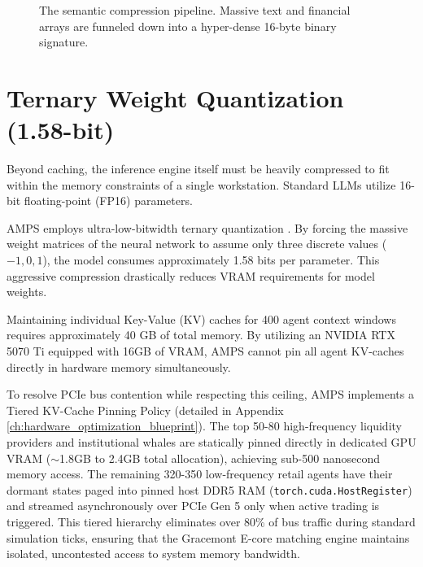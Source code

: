 \begin{figure}[htbp]
\centering
{}
\caption{The semantic compression pipeline. Massive text and financial arrays are funneled down into a hyper-dense 16-byte binary signature.}
\label{fig:mrl_quant_detail}
\end{figure}

\section{Ternary Weight Quantization (1.58-bit)}

Beyond caching, the inference engine itself must be heavily compressed to fit within the memory constraints of a single workstation. Standard LLMs utilize 16-bit floating-point (FP16) parameters. 

AMPS employs ultra-low-bitwidth ternary quantization \cite{ma2024bitnet}. By forcing the massive weight matrices of the neural network to assume only three discrete values ($-1, 0, 1$), the model consumes approximately 1.58 bits per parameter. This aggressive compression drastically reduces VRAM requirements for model weights. 

Maintaining individual Key-Value (KV) caches for 400 agent context windows requires approximately 40 GB of total memory. By utilizing an NVIDIA RTX 5070 Ti equipped with 16GB of VRAM, AMPS cannot pin all agent KV-caches directly in hardware memory simultaneously. 

To resolve PCIe bus contention while respecting this ceiling, AMPS implements a Tiered KV-Cache Pinning Policy (detailed in Appendix \ref{ch:hardware_optimization_blueprint}). The top 50-80 high-frequency liquidity providers and institutional whales are statically pinned directly in dedicated GPU VRAM ($\sim$1.8GB to 2.4GB total allocation), achieving sub-500 nanosecond memory access. The remaining 320-350 low-frequency retail agents have their dormant states paged into pinned host DDR5 RAM (\texttt{torch.cuda.HostRegister}) and streamed asynchronously over PCIe Gen 5 only when active trading is triggered. This tiered hierarchy eliminates over 80\% of bus traffic during standard simulation ticks, ensuring that the Gracemont E-core matching engine maintains isolated, uncontested access to system memory bandwidth.
